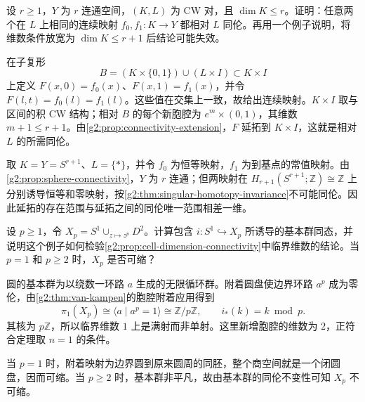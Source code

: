 \begin{exercise}\label{g2:ex:extension-uniqueness-connectivity}
	设 \(r\ge1\)，\(Y\) 为 \(r\) 连通空间，\((K,L)\) 为 CW 对，且 \(\dim K\le r\)。证明：任意两个在 \(L\) 上相同的连续映射 \(f_0,f_1:K\rightarrow Y\) 都相对 \(L\) 同伦。再用一个例子说明，将维数条件放宽为 \(\dim K\le r+1\) 后结论可能失效。
\end{exercise}
\begin{solution}
	在子复形
	\[
		B=(K\times\{0,1\})\cup(L\times I)\subset K\times I
	\]
	上定义 \(F(x,0)=f_0(x)\)、\(F(x,1)=f_1(x)\)，并令 \(F(l,t)=f_0(l)=f_1(l)\)。这些值在交集上一致，故给出连续映射。\(K\times I\) 取与区间的积 CW 结构；相对 \(B\) 的每个新胞腔为 \(e^m\times(0,1)\)，其维数 \(m+1\le r+1\)。由\cref{g2:prop:connectivity-extension}，\(F\) 延拓到 \(K\times I\)，这就是相对 \(L\) 的所需同伦。

	取 \(K=Y=S^{r+1}\)、\(L=\{*\}\)，并令 \(f_0\) 为恒等映射，\(f_1\) 为到基点的常值映射。由\cref{g2:prop:sphere-connectivity}，\(Y\) 为 \(r\) 连通；但两映射在 \(H_{r+1}(S^{r+1};\mathbb Z)\cong\mathbb Z\) 上分别诱导恒等和零映射，按\cref{g2:thm:singular-homotopy-invariance}不可能同伦。因此延拓的存在范围与延拓之间的同伦唯一范围相差一维。
\end{solution}

\begin{exercise}\label{g2:ex:critical-cell-attachment}
	设 \(p\ge1\)，令 \(X_p=S^1\cup_{z\mapsto z^p}D^2\)。计算包含 \(i:S^1\hookrightarrow X_p\) 所诱导的基本群同态，并说明这个例子如何检验\cref{g2:prop:cell-dimension-connectivity}中临界维数的结论。当 \(p=1\) 和 \(p\ge2\) 时，\(X_p\) 是否可缩？
\end{exercise}
\begin{solution}
	圆的基本群为以绕数一环路 \(a\) 生成的无限循环群。附着圆盘使边界环路 \(a^p\) 成为零伦，由\cref{g2:thm:van-kampen}的胞腔附着应用得到
	\[
		\pi_1(X_p)\cong\langle a\mid a^p=1\rangle\cong\mathbb Z/p\mathbb Z,
		\qquad i_*(k)=k\bmod p.
	\]
	其核为 \(p\mathbb Z\)，所以临界维数 \(1\) 上是满射而非单射。这里新增胞腔的维数为 \(2\)，正符合定理取 \(n=1\) 的条件。

	当 \(p=1\) 时，附着映射为边界圆到原来圆周的同胚，整个商空间就是一个闭圆盘，因而可缩。当 \(p\ge2\) 时，基本群非平凡，故由基本群的同伦不变性可知 \(X_p\) 不可缩。
\end{solution}

